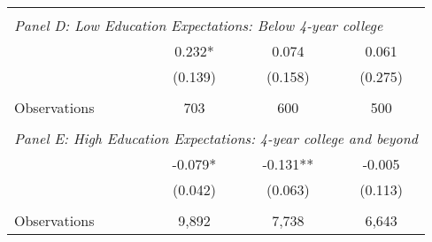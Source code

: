 {\begin{tabular}{lccc}
&  &  &   \\
\multicolumn{4}{l}{\textit{Panel D: Low Education Expectations: Below 4-year college}} \\
\hspace{3mm}        &       0.232*  &       0.074   &       0.061   \\
                    &     (0.139)   &     (0.158)   &     (0.275)   \\
                    &               &               &               \\
\hspace{3mm}Observations&         703   &         600   &         500   \\
 
&  &  &   \\
\multicolumn{4}{l}{\textit{Panel E: High Education Expectations: 4-year college and beyond}} \\
\hspace{3mm}        &      -0.079*  &      -0.131** &      -0.005   \\
                    &     (0.042)   &     (0.063)   &     (0.113)   \\
                    &               &               &               \\
\hspace{3mm}Observations&       9,892   &       7,738   &       6,643   \\
 

\bottomrule
\end{tabular}
}
